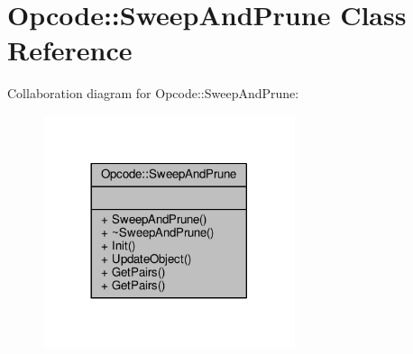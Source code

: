 \hypertarget{classOpcode_1_1SweepAndPrune}{}\section{Opcode\+:\+:Sweep\+And\+Prune Class Reference}
\label{classOpcode_1_1SweepAndPrune}


Collaboration diagram for Opcode\+:\+:Sweep\+And\+Prune\+:
\nopagebreak
\begin{figure}[H]
\begin{center}
\leavevmode
\includegraphics[width=209pt]{dd/db6/classOpcode_1_1SweepAndPrune__coll__graph}
\end{center}
\end{figure}
